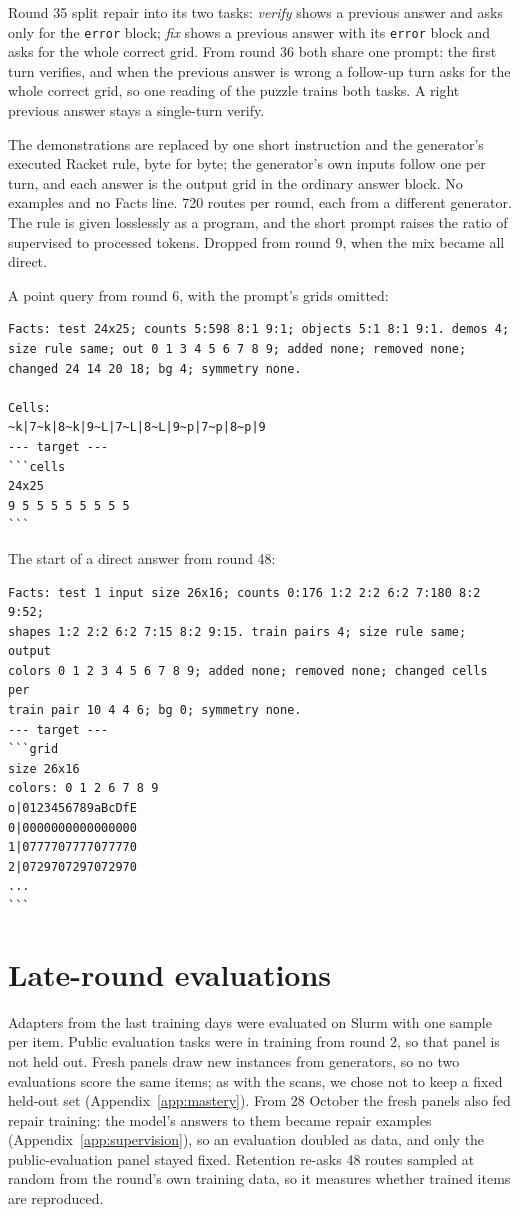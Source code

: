 \documentclass[11pt]{article}
\begin{document}
\begin{description}[nosep,leftmargin=1.5em]
  \item[Verify, fix, verify-then-fix.] Round 35 split repair into its two tasks: \emph{verify} shows a previous answer and asks only for the \texttt{error} block; \emph{fix} shows a previous answer with its \texttt{error} block and asks for the whole correct grid. From round 36 both share one prompt: the first turn verifies, and when the previous answer is wrong a follow-up turn asks for the whole correct grid, so one reading of the puzzle trains both tasks. A right previous answer stays a single-turn verify.
  \item[Exec (rounds 7--8).] The demonstrations are replaced by one short instruction and the generator's executed Racket rule, byte for byte; the generator's own inputs follow one per turn, and each answer is the output grid in the ordinary answer block. No examples and no Facts line. 720 routes per round, each from a different generator. The rule is given losslessly as a program, and the short prompt raises the ratio of supervised to processed tokens. Dropped from round 9, when the mix became all direct.
\end{description}

A point query from round 6, with the prompt's grids omitted:
\begin{lstlisting}
Facts: test 24x25; counts 5:598 8:1 9:1; objects 5:1 8:1 9:1. demos 4;
size rule same; out 0 1 3 4 5 6 7 8 9; added none; removed none;
changed 24 14 20 18; bg 4; symmetry none.

Cells:
~k|7~k|8~k|9~L|7~L|8~L|9~p|7~p|8~p|9
--- target ---
```cells
24x25
9 5 5 5 5 5 5 5 5
```
\end{lstlisting}

The start of a direct answer from round 48:
\begin{lstlisting}
Facts: test 1 input size 26x16; counts 0:176 1:2 2:2 6:2 7:180 8:2 9:52;
shapes 1:2 2:2 6:2 7:15 8:2 9:15. train pairs 4; size rule same; output
colors 0 1 2 3 4 5 6 7 8 9; added none; removed none; changed cells per
train pair 10 4 4 6; bg 0; symmetry none.
--- target ---
```grid
size 26x16
colors: 0 1 2 6 7 8 9
o|0123456789aBcDfE
0|0000000000000000
1|0777707777077770
2|0729707297072970
...
```
\end{lstlisting}

\section{Late-round evaluations}
\label{app:evals}

Adapters from the last training days were evaluated on Slurm with one sample per
item. Public evaluation tasks were in training from round 2, so that panel is
not held out. Fresh panels draw new instances from generators, so no two
evaluations score the same items; as with the scans, we chose not to keep a
fixed held-out set (Appendix~\ref{app:mastery}). From 28 October the fresh
panels also fed repair training: the model's answers to them became repair
examples (Appendix~\ref{app:supervision}), so an evaluation doubled as data, and only the
public-evaluation panel stayed fixed. Retention re-asks 48 routes sampled at
random from the round's own training data, so it measures whether trained
items are reproduced.
\end{document}
